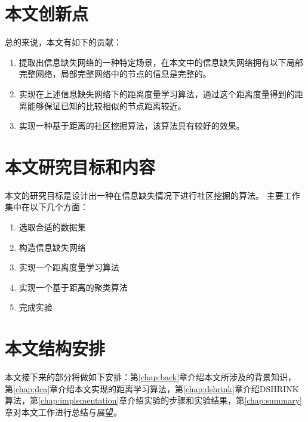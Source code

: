\section{本文创新点}

总的来说，本文有如下的贡献：

\begin{enumerate}
\item 提取出信息缺失网络的一种特定场景，在本文中的信息缺失网络拥有以下局部完整网络，局部完整网络中的节点的信息是完整的。
\item 实现在上述信息缺失网络下的距离度量学习算法，通过这个距离度量得到的距离能够保证已知的比较相似的节点距离较近。
\item 实现一种基于距离的社区挖掘算法，该算法具有较好的效果。
\end{enumerate}

\section{本文研究目标和内容}

本文的研究目标是设计出一种在信息缺失情况下进行社区挖掘的算法。
主要工作集中在以下几个方面：

\begin{enumerate}
\item 选取合适的数据集
\item 构造信息缺失网络
\item 实现一个距离度量学习算法
\item 实现一个基于距离的聚类算法
\item 完成实验
\end{enumerate}

\section{本文结构安排}

本文接下来的部分将做如下安排：第\ref{chap:back}章介绍本文所涉及的背景知识，
第\ref{chap:dca}章介绍本文实现的距离学习算法，第\ref{chap:dshrink}章介绍DSHRINK算法，第\ref{chap:implementation}章介绍实验的步骤和实验结果，第\ref{chap:summary}章对本文工作进行总结与展望。
